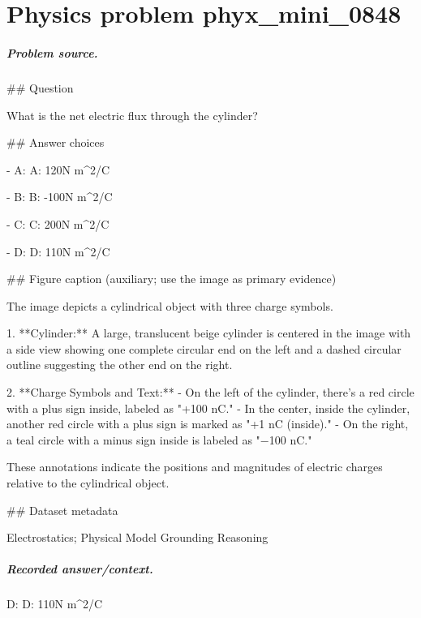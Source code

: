 
\chapter{Physics problem phyx\_mini\_0848}
\label{ch:PhyXMiniProblems_problem_phyx_mini_0848}

\paragraph{Problem source.}
\#\# Question

What is the net electric flux through the cylinder?

\#\# Answer choices

- A: A: 120N m\textasciicircum{}2/C

- B: B: -100N m\textasciicircum{}2/C

- C: C: 200N m\textasciicircum{}2/C

- D: D: 110N m\textasciicircum{}2/C

\#\# Figure caption (auxiliary; use the image as primary evidence)

The image depicts a cylindrical object with three charge symbols. 

1. **Cylinder:** A large, translucent beige cylinder is centered in the image with a side view showing one complete circular end on the left and a dashed circular outline suggesting the other end on the right.

2. **Charge Symbols and Text:**
   - On the left of the cylinder, there's a red circle with a plus sign inside, labeled as "+100 nC."
   - In the center, inside the cylinder, another red circle with a plus sign is marked as "+1 nC (inside)."
   - On the right, a teal circle with a minus sign inside is labeled as "−100 nC."

These annotations indicate the positions and magnitudes of electric charges relative to the cylindrical object.

\#\# Dataset metadata

Electrostatics; Physical Model Grounding Reasoning

\paragraph{Recorded answer/context.}
D: D: 110N m\textasciicircum{}2/C

